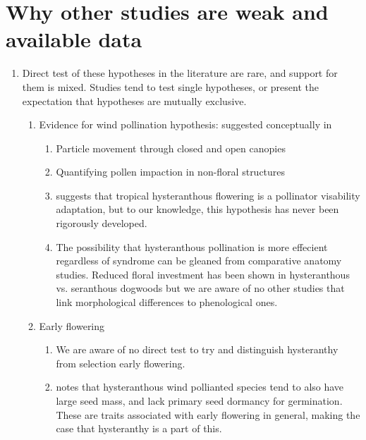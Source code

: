 \documentclass[12pt]{article}\usepackage[]{graphicx}\usepackage[]{color}
\begin{document}

\section*{ Why other studies are weak and available data} %
\begin{enumerate}
\item Direct test of these hypotheses in the literature are rare, and support for them is mixed. Studies tend to test single hypotheses, or present the expectation that hypotheses are mutually exclusive.
\begin{enumerate}
\item  Evidence for wind pollination hypothesis: suggested conceptually in \citep{Robertson1895,Rathcke_1985,Whitehead1969}
\begin{enumerate}
\item Particle movement through closed and open canopies \citep{Niklas1985,Nathan2005, Milleron2012}
\item Quantifying pollen impaction in non-floral structures \citep{Tauber1967}
\item \citet{Janzen1967} suggests that tropical hysteranthous flowering is a pollinator visability adaptation, but to our knowledge, this hypothesis has never been rigorously developed.
\item The possibility that hysteranthous pollination is more effecient regardless of syndrome can be gleaned from comparative anatomy studies. Reduced floral investment has been shown in hysteranthous vs. seranthous dogwoods \citep{Gunatilleke1984} but we are aware of no other studies that link morphological differences to phenological ones. 
\end{enumerate}
\item{Early flowering}
\begin{enumerate}
\item We are aware of no direct test to try and distinguish hysteranthy from selection early flowering.
\item \citet{Primack1987} notes that hysteranthous wind pollianted species tend to also have large seed mass, and lack primary seed dormancy for germination. These are traits associated with early flowering in general, making the case that hysteranthy is a part of this.

\end{enumerate}
\end{enumerate}
\end{enumerate}
\end{document}
